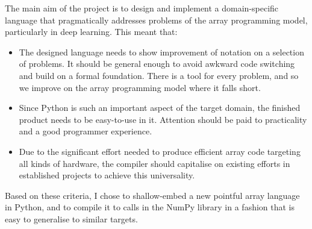 The main aim of the project is to design and implement a domain-specific language that pragmatically addresses problems of the array programming model, particularly in deep learning. This meant that:
\begin{itemize}
    \item The designed language needs to show improvement of notation on a selection of problems. It should be general enough to avoid awkward code switching and build on a formal foundation. There is a tool for every problem, and so we improve on the array programming model where it falls short. 
    \item Since Python is such an important aspect of the target domain, the finished product needs to be easy-to-use in it. Attention should be paid to practicality and a good programmer experience.
    \item Due to the significant effort needed to produce efficient array code targeting all kinds of hardware, the compiler should capitalise on existing efforts in established projects to achieve this universality.
\end{itemize}
Based on these criteria, I chose to shallow-embed a new pointful array language in Python, and to compile it to calls in the NumPy library in a fashion that is easy to generalise to similar targets.